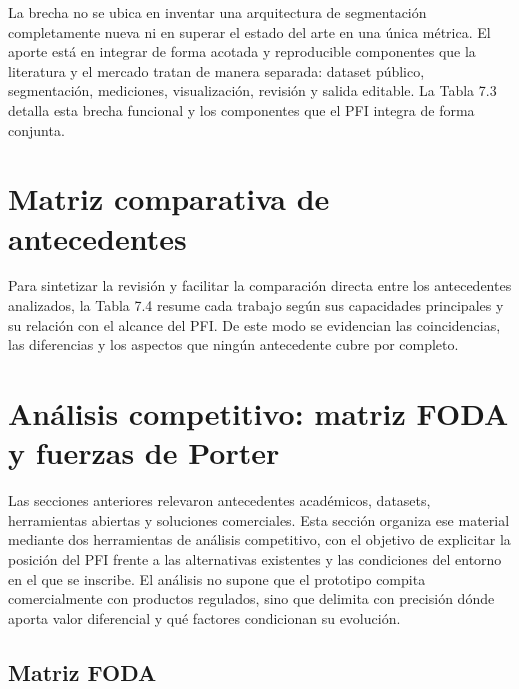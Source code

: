 La brecha no se ubica en inventar una arquitectura de segmentación completamente nueva ni en superar el estado del arte en una única métrica. El aporte está en integrar de forma acotada y reproducible componentes que la literatura y el mercado tratan de manera separada: dataset público, segmentación, mediciones, visualización, revisión y salida editable. La Tabla 7.3 detalla esta brecha funcional y los componentes que el PFI integra de forma conjunta.


\section{Matriz comparativa de antecedentes}

Para sintetizar la revisión y facilitar la comparación directa entre los antecedentes analizados, la Tabla 7.4 resume cada trabajo según sus capacidades principales y su relación con el alcance del PFI. De este modo se evidencian las coincidencias, las diferencias y los aspectos que ningún antecedente cubre por completo.


\section{Análisis competitivo: matriz FODA y fuerzas de Porter}

Las secciones anteriores relevaron antecedentes académicos, datasets, herramientas abiertas y soluciones comerciales. Esta sección organiza ese material mediante dos herramientas de análisis competitivo, con el objetivo de explicitar la posición del PFI frente a las alternativas existentes y las condiciones del entorno en el que se inscribe. El análisis no supone que el prototipo compita comercialmente con productos regulados, sino que delimita con precisión dónde aporta valor diferencial y qué factores condicionan su evolución.

\subsection{Matriz FODA}


